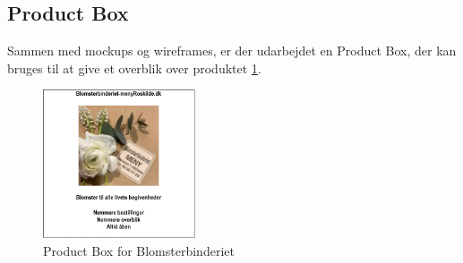 \subsection{Product Box}
Sammen med mockups og wireframes, er der udarbejdet en Product Box, der kan bruges til at give et overblik over produktet \ref{fig:product-box}.
\begin{figure}[H]
    \centering
    \includegraphics[width=0.4\textwidth]{figures/business/product-box.png}
    \caption{Product Box for Blomsterbinderiet}
    \label{fig:product-box}
\end{figure}


